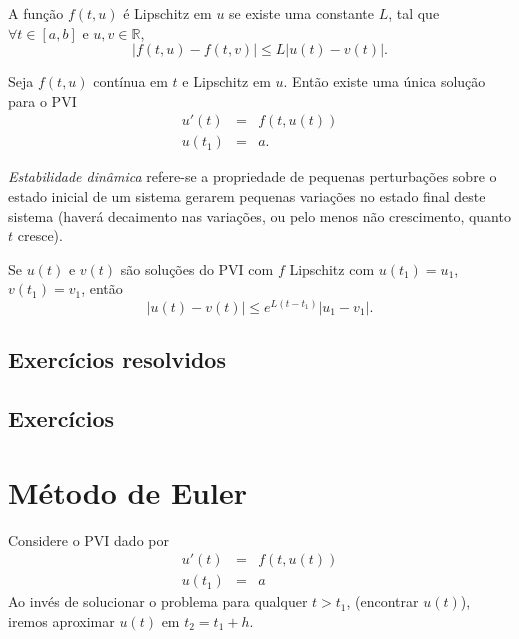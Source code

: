 \begin{defn}
A função $f(t, u)$ é Lipschitz em $u$ se existe uma constante $L$, tal que $\forall t \in [a, b]$ e $u,v \in \mathbb R$,
$$ |f(t, u)-f(t, v)| \leq L|u(t)-v(t)|. $$
\end{defn}


\begin{teo}
Seja $f(t, u)$ contínua em $t$ e Lipschitz em $u$. Então existe uma única solução para o PVI
\begin{eqnarray}
  u'(t)  &=& f(t, u(t)) \\
  u(t_1) &=& a.
\end{eqnarray}
\end{teo}

\begin{defn}
  \emph{Estabilidade dinâmica} refere-se a propriedade de pequenas perturbações sobre o estado inicial de um sistema gerarem pequenas variações no estado final deste sistema (haverá decaimento nas variações, ou pelo menos não crescimento, quanto $t$ cresce).
\end{defn}

\begin{teo}
Se $u(t)$ e $v(t)$ são soluções do PVI com $f$ Lipschitz com $u(t_1)=u_1$, $v(t_1)=v_1$, então
$$ |u(t)-v(t)| \leq  e^{L(t-t_1)}|u_1-v_1| . $$
\end{teo}

\subsection*{Exercícios resolvidos}

\emconstrucao

\subsection*{Exercícios}

\emconstrucao

\section{Método de Euler}
Considere o PVI dado por
\begin{eqnarray}\label{EDO1}
  u'(t)  &=& f(t,u(t)) \\
  u(t_1) &=& a
\end{eqnarray}
Ao invés de solucionar o problema para qualquer $t>t_1$, (encontrar $u(t)$), iremos aproximar $u(t)$ em $t_2=t_1+h$.

